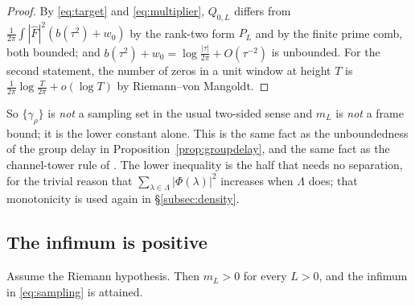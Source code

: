\begin{proof}
By \eqref{eq:target} and \eqref{eq:multiplier}, $Q_{0,L}$ differs from
$\frac1{2\pi}\int|\widehat F|^2(b(\tau^2)+w_0)$ by the rank-two form $P_L$ and by
the finite prime comb, both bounded; and $b(\tau^2)+w_0=\log\frac{|\tau|}{2\pi}+
O(\tau^{-2})$ is unbounded. For the second statement, the number of zeros in a
unit window at height $T$ is $\frac1{2\pi}\log\frac T{2\pi}+o(\log T)$ by
Riemann--von Mangoldt.
\end{proof}

So $\{\gamma_\rho\}$ is \emph{not} a sampling set in the usual two-sided sense and
$m_L$ is \emph{not} a frame bound; it is the lower constant alone. This is the
same fact as the unboundedness of the group delay in
Proposition~\ref{prop:groupdelay}, and the same fact as the channel-tower rule of
\cite{Selection}. The lower inequality is the half that needs no separation, for
the trivial reason that $\sum_{\lambda\in\Lambda}|\Phi(\lambda)|^2$ increases when
$\Lambda$ does; that monotonicity is used again in \S\ref{subsec:density}.

\subsection{The infimum is positive}

\begin{proposition}\label{prop:positive}
Assume the Riemann hypothesis. Then $m_L>0$ for every $L>0$, and the infimum in
\eqref{eq:sampling} is attained.
\end{proposition}

